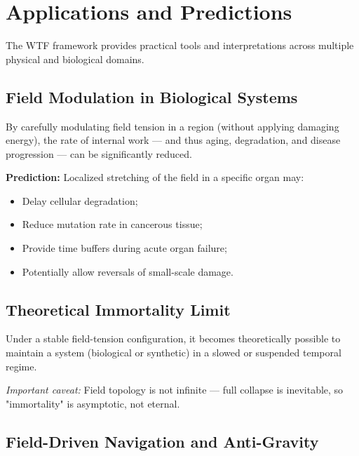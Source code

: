 \section{Applications and Predictions}

The WTF framework provides practical tools and interpretations across multiple physical and biological domains.

\vspace{10pt}

\subsection{Field Modulation in Biological Systems}

By carefully modulating field tension in a region (without applying damaging energy), the rate of internal work — and thus aging, degradation, and disease progression — can be significantly reduced.

\textbf{Prediction:}  
Localized stretching of the field in a specific organ may:
\begin{itemize}
    \item Delay cellular degradation;
    \item Reduce mutation rate in cancerous tissue;
    \item Provide time buffers during acute organ failure;
    \item Potentially allow reversals of small-scale damage.
\end{itemize}

\vspace{10pt}

\subsection{Theoretical Immortality Limit}

Under a stable field-tension configuration, it becomes theoretically possible to maintain a system (biological or synthetic) in a slowed or suspended temporal regime.

\textit{Important caveat:}  
Field topology is not infinite — full collapse is inevitable, so "immortality" is asymptotic, not eternal.

\vspace{10pt}

\subsection{Field-Driven Navigation and Anti-Gravity}

